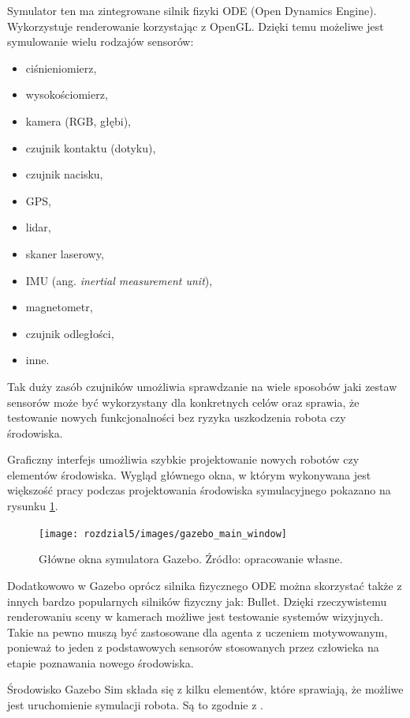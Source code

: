 Symulator ten ma zintegrowane silnik fizyki ODE (Open Dynamics Engine). Wykorzystuje
renderowanie korzystając z OpenGL. Dzięki temu możeliwe jest symulowanie wielu 
rodzajów sensorów:

\begin{itemize}
    \item ciśnieniomierz,
    \item wysokościomierz,
    \item kamera (RGB, głębi),
    \item czujnik kontaktu (dotyku),
    \item czujnik nacisku,
    \item GPS,
    \item lidar,
    \item skaner laserowy,
    \item IMU (ang. \textit{inertial measurement unit}),
    \item magnetometr,
    \item czujnik odległości,
    \item inne.
\end{itemize}

Tak duży zasób czujników umożliwia sprawdzanie na wiele sposobów jaki zestaw 
sensorów może być wykorzystany dla konkretnych celów oraz sprawia, że testowanie
nowych funkcjonalności bez ryzyka uszkodzenia robota czy środowiska. 

Graficzny interfejs umożliwia szybkie projektowanie nowych robotów czy elementów
środowiska. Wygląd głównego okna, w którym wykonywana jest większość pracy
podczas projektowania środowiska symulacyjnego pokazano na rysunku 
\ref{fig:gazebo_main_window}.

\begin{figure}[h]
    \centering
    \texttt{[image: rozdzial5/images/gazebo\_main\_window]}
    \caption{Główne okna symulatora Gazebo. Źródło: opracowanie własne.}
    \label{fig:gazebo_main_window}
\end{figure}

Dodatkowowo w Gazebo oprócz silnika fizycznego ODE można skorzystać także z innych
bardzo popularnych silników fizyczny jak: Bullet. Dzięki rzeczywistemu renderowaniu
sceny w kamerach możliwe jest testowanie systemów wizyjnych. Takie na pewno
muszą być zastosowane dla agenta z uczeniem motywowanym, ponieważ to jeden
z podstawowych sensorów stosowanych przez człowieka na etapie poznawania nowego
środowiska.

Środowisko Gazebo Sim składa się z kilku elementów, które sprawiają, że możliwe
jest uruchomienie symulacji robota. Są to zgodnie z \cite{gazebo_components}.

